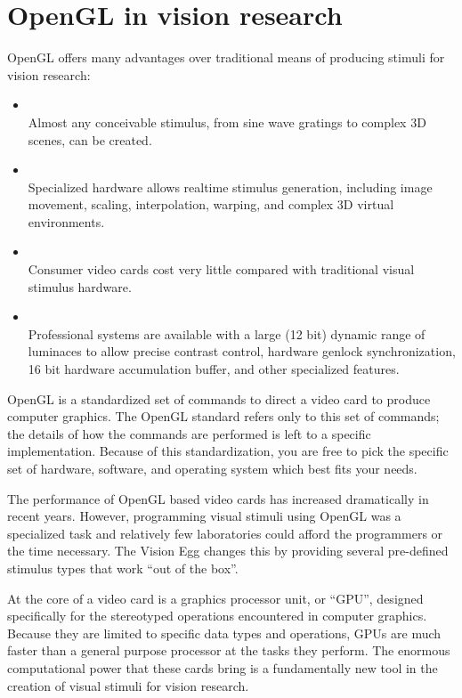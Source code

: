 \chapter{OpenGL in vision research \label{opengl}}

OpenGL offers many advantages over traditional means of producing
stimuli for vision research:

\begin{itemize}

\item {}\\
	Almost any conceivable stimulus, from sine wave gratings to
	complex 3D scenes, can be created.

\item {}\\
	Specialized hardware allows realtime stimulus generation,
	including image movement, scaling, interpolation, warping, and
	complex 3D virtual environments.

\item {}\\
	Consumer video cards cost very little compared with
	traditional visual stimulus hardware.

\item {}\\
	Professional systems are available with a large (12 bit)
	dynamic range of luminaces to allow precise contrast control,
	hardware genlock synchronization, 16 bit hardware accumulation
	buffer, and other specialized features.

\end{itemize}

OpenGL is a standardized set of commands to direct a video card to
produce computer graphics.  The OpenGL standard refers only to this
set of commands; the details of how the commands are performed is left
to a specific implementation.  Because of this standardization, you
are free to pick the specific set of hardware, software, and operating
system which best fits your needs.

The performance of OpenGL based video cards has increased dramatically
in recent years. However, programming visual stimuli using OpenGL was
a specialized task and relatively few laboratories could afford the
programmers or the time necessary. The Vision Egg changes this by
providing several pre-defined stimulus types that work ``out of the
box''.

At the core of a video card is a graphics processor unit, or ``GPU'',
designed specifically for the stereotyped operations encountered in
computer graphics. Because they are limited to specific data types and
operations, GPUs are much faster than a general purpose processor at
the tasks they perform. The enormous computational power that these
cards bring is a fundamentally new tool in the creation of visual
stimuli for vision research.